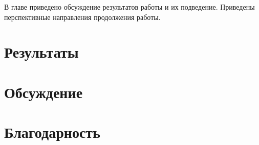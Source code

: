В главе приведено обсуждение результатов работы и их подведение. Приведены перспективные направления продолжения работы.

\section{Результаты}


\section{Обсуждение}


\section{Благодарность}

